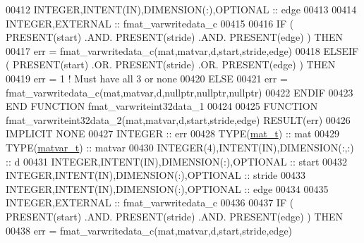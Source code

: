 \begin{DoxyCode}
00412     \textcolor{keywordtype}{INTEGER},\textcolor{keywordtype}{INTENT(IN)},\textcolor{keywordtype}{DIMENSION(:)},\textcolor{keywordtype}{OPTIONAL} :: edge
00413 
00414     \textcolor{keywordtype}{INTEGER},\textcolor{keywordtype}{EXTERNAL}                         :: fmat\_varwritedata\_c
00415 
00416     \textcolor{keywordflow}{IF} ( \textcolor{keyword}{PRESENT}(start) .AND. \textcolor{keyword}{PRESENT}(stride) .AND. \textcolor{keyword}{PRESENT}(edge) ) \textcolor{keywordflow}{THEN}
00417         err = fmat\_varwritedata\_c(mat,matvar,d,start,stride,edge)
00418     \textcolor{keywordflow}{ELSEIF} ( \textcolor{keyword}{PRESENT}(start) .OR. \textcolor{keyword}{PRESENT}(stride) .OR. \textcolor{keyword}{PRESENT}(edge) ) \textcolor{keywordflow}{THEN}
00419         err = 1    \textcolor{comment}{! Must have all 3 or none}
00420     \textcolor{keywordflow}{ELSE}
00421         err = fmat\_varwritedata\_c(mat,matvar,d,nullptr,nullptr,nullptr)
00422 \textcolor{keywordflow}{    ENDIF}
00423 \textcolor{keyword}{END FUNCTION }fmat\_varwriteint32data\_1
00424 
00425 \textcolor{keyword}{FUNCTION }fmat\_varwriteint32data\_2(mat,matvar,d,start,stride,edge) \textcolor{keyword}{RESULT}(err)
00426 \textcolor{keywordtype}{IMPLICIT NONE}
00427     \textcolor{keywordtype}{INTEGER}                                  :: err
00428     \textcolor{keywordtype}{TYPE}(\hyperlink{group___m_a_t_gab0fc888f5a5d79943b16284b1f91c2e8}{mat\_t})                              :: mat
00429     \textcolor{keywordtype}{TYPE}(\hyperlink{group___m_a_t_structmatvar__t}{matvar\_t})                           :: matvar
00430     \textcolor{keywordtype}{INTEGER(4)},\textcolor{keywordtype}{INTENT(IN)},\textcolor{keywordtype}{DIMENSION(:,:)}     :: d
00431     \textcolor{keywordtype}{INTEGER},\textcolor{keywordtype}{INTENT(IN)},\textcolor{keywordtype}{DIMENSION(:)},\textcolor{keywordtype}{OPTIONAL} :: start
00432     \textcolor{keywordtype}{INTEGER},\textcolor{keywordtype}{INTENT(IN)},\textcolor{keywordtype}{DIMENSION(:)},\textcolor{keywordtype}{OPTIONAL} :: stride
00433     \textcolor{keywordtype}{INTEGER},\textcolor{keywordtype}{INTENT(IN)},\textcolor{keywordtype}{DIMENSION(:)},\textcolor{keywordtype}{OPTIONAL} :: edge
00434 
00435     \textcolor{keywordtype}{INTEGER},\textcolor{keywordtype}{EXTERNAL}                         :: fmat\_varwritedata\_c
00436 
00437     \textcolor{keywordflow}{IF} ( \textcolor{keyword}{PRESENT}(start) .AND. \textcolor{keyword}{PRESENT}(stride) .AND. \textcolor{keyword}{PRESENT}(edge) ) \textcolor{keywordflow}{THEN}
00438         err = fmat\_varwritedata\_c(mat,matvar,d,start,stride,edge)

\end{DoxyCode}
